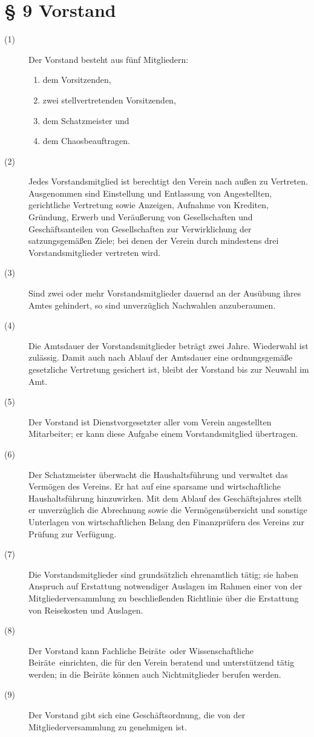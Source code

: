 \documentclass[12pt,paper=a4,ngerman]{scrreprt}
\begin{document}
\section{\S{} 9 Vorstand}
\begin{description}
	\item[(1)] Der Vorstand besteht aus fünf Mitgliedern:
	\begin{enumerate}
		\item dem Vorsitzenden,
		\item zwei stellvertretenden Vorsitzenden,
		\item dem Schatzmeister und
		\item dem Chaosbeauftragen.
	\end{enumerate}
	\item[(2)] Jedes Vorstandsmitglied ist berechtigt den Verein nach außen zu Vertreten. Ausgenommen sind Einstellung und Entlassung von Angestellten, gerichtliche Vertretung sowie Anzeigen, Aufnahme von Krediten, Gründung, Erwerb und Veräußerung von Gesellschaften und Geschäftsanteilen von Gesellschaften zur Verwirklichung der satzungsgemäßen Ziele; bei denen der Verein durch mindestens drei Vorstandsmitglieder vertreten wird.
	\item[(3)] Sind zwei oder mehr Vorstandsmitglieder dauernd an der Ausübung ihres Amtes gehindert, so sind unverzüglich Nachwahlen anzuberaumen.
	\item[(4)] Die Amtsdauer der Vorstandsmitglieder beträgt zwei Jahre. Wiederwahl ist zulässig. Damit auch nach Ablauf der Amtsdauer eine ordnungsgemäße gesetzliche Vertretung gesichert ist, bleibt der Vorstand bis zur Neuwahl im Amt.
	\item[(5)] Der Vorstand ist Dienstvorgesetzter aller vom Verein angestellten Mitarbeiter; er kann diese Aufgabe einem Vorstandsmitglied übertragen.
	\item[(6)] Der Schatzmeister überwacht die Haushaltsführung und verwaltet das Vermögen des Vereins. Er hat auf eine sparsame und wirtschaftliche Haushaltsführung hinzuwirken. Mit dem Ablauf des Geschäftsjahres stellt er unverzüglich die Abrechnung sowie die Vermögensübersicht und sonstige Unterlagen von wirtschaftlichen Belang den Finanzprüfern des Vereins zur Prüfung zur Verfügung.
	\item[(7)] Die Vorstandsmitglieder sind grundsätzlich ehrenamtlich tätig; sie haben Anspruch auf Erstattung notwendiger Auslagen im Rahmen einer von der Mitgliederversammlung zu beschließenden Richtlinie über die Erstattung von Reisekosten und Auslagen.
	\item[(8)] Der Vorstand kann \glqq Fachliche Beiräte\grqq ~oder \glqq Wissenschaftliche Beiräte\grqq ~einrichten, die für den Verein beratend und unterstützend tätig werden; in die Beiräte können auch Nichtmitglieder berufen werden.
	\item[(9)] Der Vorstand gibt sich eine Geschäftsordnung, die von der Mitgliederversammlung zu genehmigen ist.
\end{description}
\end{document}
